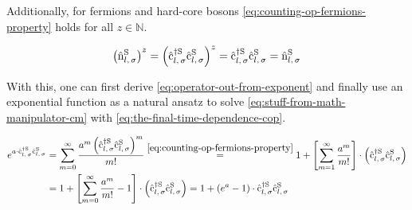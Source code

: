 Additionally, for fermions and hard-core bosons \autoref{eq:counting-op-fermions-property} holds for all $z \in \mathbb{N}$.

\begin{equation}
    \label{eq:counting-op-fermions-property}
    \left(\nop[\schroedingerPicture]{l}{\sigma}\right)^z = 
    \left(\withspinop[\schroedingerPicture]{l}{\sigma}{\dagger}\withspinop[\schroedingerPicture]{l}{\sigma}{}\right)^z = 
    \withspinop[\schroedingerPicture]{l}{\sigma}{\dagger}\withspinop[\schroedingerPicture]{l}{\sigma}{} = 
    \nop[\schroedingerPicture]{l}{\sigma}
\end{equation}

With this, one can first derive \autoref{eq:operator-out-from-exponent} and finally use an exponential function as a natural ansatz to solve \autoref{eq:stuff-from-math-manipulator-cm} with \autoref{eq:the-final-time-dependence-cop}.

\begin{equation}
    \label{eq:operator-out-from-exponent}
    \begin{split}
        e^{a \cdot \withspinop[\schroedingerPicture]{l}{\sigma}{\dagger}\withspinop[\schroedingerPicture]{l}{\sigma}{}} &= \sum\limits_{m=0}^\infty \frac{a^m \left(\withspinop[\schroedingerPicture]{l}{\sigma}{\dagger}\withspinop[\schroedingerPicture]{l}{\sigma}{}\right)^m}{m!}
        \stackrel{\ref{eq:counting-op-fermions-property}}{=} 1 + \left[\sum\limits_{m=1}^\infty \frac{a^m}{m!}\right]\cdot \left(\withspinop[\schroedingerPicture]{l}{\sigma}{\dagger}\withspinop[\schroedingerPicture]{l}{\sigma}{}\right)\\
        &= 1 + \left[\sum\limits_{m=0}^\infty \frac{a^m}{m!}-1\right]\cdot \left(\withspinop[\schroedingerPicture]{l}{\sigma}{\dagger}\withspinop[\schroedingerPicture]{l}{\sigma}{}\right)
         = 1 + \left(e^a-1\right)\cdot \withspinop[\schroedingerPicture]{l}{\sigma}{\dagger}\withspinop[\schroedingerPicture]{l}{\sigma}{}
    \end{split}
\end{equation}


